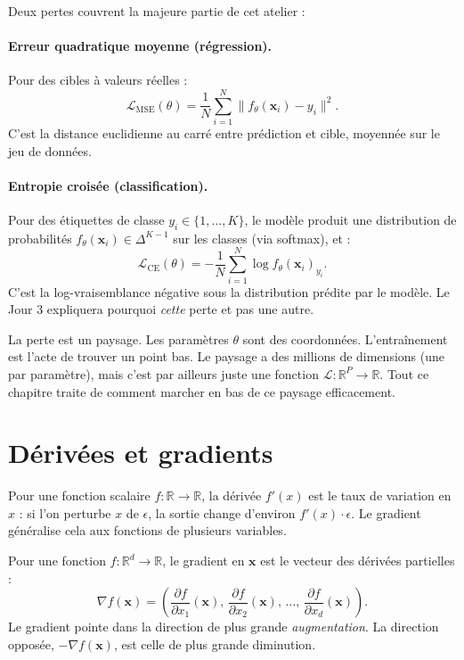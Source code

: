 Deux pertes couvrent la majeure partie de cet atelier :

\paragraph{Erreur quadratique moyenne (régression).} Pour des cibles à valeurs réelles :
\[
\mathcal{L}_{\text{MSE}}(\theta) = \frac{1}{N} \sum_{i=1}^N \|f_\theta(\bm{x}_i) - y_i\|^2.
\]
C'est la distance euclidienne au carré entre prédiction et cible, moyennée sur le jeu de données.

\paragraph{Entropie croisée (classification).} Pour des étiquettes de classe $y_i \in \{1, \ldots, K\}$, le modèle produit une distribution de probabilités $f_\theta(\bm{x}_i) \in \Delta^{K-1}$ sur les classes (via softmax), et :
\[
\mathcal{L}_{\text{CE}}(\theta) = -\frac{1}{N} \sum_{i=1}^N \log f_\theta(\bm{x}_i)_{y_i}.
\]
C'est la log-vraisemblance négative sous la distribution prédite par le modèle. Le Jour 3 expliquera pourquoi \emph{cette} perte et pas une autre.

\begin{intuition}
La perte est un paysage. Les paramètres $\theta$ sont des coordonnées. L'entraînement est l'acte de trouver un point bas. Le paysage a des millions de dimensions (une par paramètre), mais c'est par ailleurs juste une fonction $\mathcal{L}: \mathbb{R}^P \to \mathbb{R}$. Tout ce chapitre traite de comment marcher en bas de ce paysage efficacement.
\end{intuition}

\section{Dérivées et gradients}

Pour une fonction scalaire $f: \mathbb{R} \to \mathbb{R}$, la dérivée $f'(x)$ est le taux de variation en $x$ : si l'on perturbe $x$ de $\epsilon$, la sortie change d'environ $f'(x) \cdot \epsilon$. Le gradient généralise cela aux fonctions de plusieurs variables.

\begin{definition}[Gradient]
Pour une fonction $f: \mathbb{R}^d \to \mathbb{R}$, le gradient en $\bm{x}$ est le vecteur des dérivées partielles :
\[
\nabla f(\bm{x}) = \left( \frac{\partial f}{\partial x_1}(\bm{x}), \, \frac{\partial f}{\partial x_2}(\bm{x}), \, \ldots, \, \frac{\partial f}{\partial x_d}(\bm{x}) \right).
\]
Le gradient pointe dans la direction de plus grande \emph{augmentation}. La direction opposée, $-\nabla f(\bm{x})$, est celle de plus grande diminution.
\end{definition}

